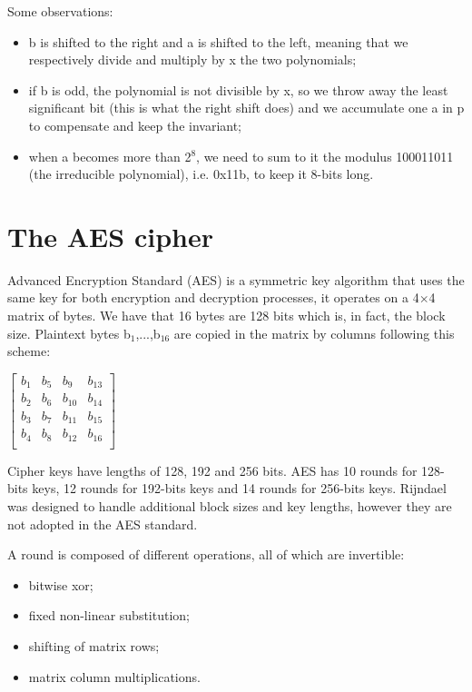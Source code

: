 \documentclass[a4paper, 12pt]{report}
\begin{document}
Some observations:
\begin{itemize}
	\item b is shifted to the right and a is shifted to the left, meaning that we respectively divide and multiply by x the two polynomials;
	\item if b is odd, the polynomial is not divisible by x, so we throw away the least significant bit (this is what the right shift does) and we accumulate one a in p to compensate and keep the invariant;
	\item when a becomes more than 2$^8$, we need to sum to it the modulus 100011011 (the irreducible polynomial), i.e. 0x11b, to keep it 8-bits long.
\end{itemize}

\section*{The AES cipher}
Advanced Encryption Standard (AES) is a symmetric key algorithm that uses the same key for both encryption and decryption processes, it operates on a 4$\times$4 matrix of bytes. We have that 16 bytes are 128 bits which is, in fact, the block size. Plaintext bytes b$_1$,...,b$_{16}$ are copied in the matrix by columns following this scheme:
\begin{center}$
	\begin{bmatrix}
		b_1 & b_5 & b_9 & b_{13}\\
		b_2 & b_6 & b_{10} & b_{14}\\
		b_3 & b_7 & b_{11} & b_{15}\\
		b_4 & b_8 & b_{12} & b_{16}\\
	\end{bmatrix}$
\end{center}

Cipher keys have lengths of 128, 192 and 256 bits. AES has 10 rounds for 128-bits keys, 12 rounds for 192-bits keys and 14 rounds for 256-bits keys. Rijndael was designed to handle additional block sizes and key lengths, however they are not adopted in the AES standard.

A round is composed of different operations, all of which are invertible:
\begin{itemize}
	\item bitwise xor;
	\item fixed non-linear substitution;
	\item shifting of matrix rows;
	\item matrix column multiplications.
\end{itemize}
\end{document}
